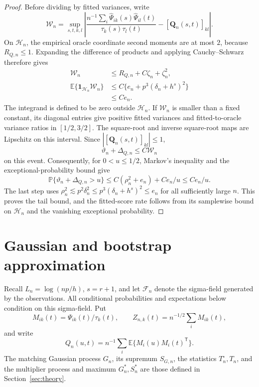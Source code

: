 \documentclass[10pt]{book}
\newcommand{\bQ}{{\mathbf Q}}
\newcommand{\expect}{\mathbb{E}}
\newcommand{\prob}{\mathbb{P}}
\newcommand{\trans}{{\scriptscriptstyle\mathsf{T}}}
\numberwithin{equation}{section}
\begin{document}
\begin{proof}
Before dividing by fitted variances, write
\[
\mathcal W_n=\sup_{s,t,k,l}
\left|\frac{n^{-1}\sum_i
\widehat\Psi_{ik}(s)\widehat\Psi_{il}(t)}
{\tau_k(s)\tau_l(t)}-[\bQ_n(s,t)]_{kl}\right|.
\]
On $\mathcal H_n$, the empirical oracle coordinate second moments
are at most $2$, because $R_{Q,n}\le1$.  Expanding the difference
of products and applying Cauchy--Schwarz therefore gives
\[
\begin{aligned}
\mathcal W_n&\le R_{Q,n}+C\zeta_n+\zeta_n^2,\\
\expect\{\mathbf1_{\mathcal H_n}\mathcal W_n\}
&\le C\{e_n+p^3(\delta_n+h^s)^2\}\\
&\le Ce_n.
\end{aligned}
\]
The integrand is defined to be zero outside $\mathcal H_n$.
If $\mathcal W_n$ is smaller than a fixed constant, its diagonal
entries give positive fitted variances and fitted-to-oracle variance
ratios in $[1/2,3/2]$.  The square-root and inverse square-root maps
are Lipschitz on this interval.  Since $|[\bQ_n(s,t)]_{kl}|\le1$,
\[
\vartheta_n+\Delta_{Q,n}\le C\mathcal W_n
\]
on this event.  Consequently, for $0<u\le1/2$, Markov's inequality
and the exceptional-probability bound give
\[
\prob\{\vartheta_n+\Delta_{Q,n}>u\}
\le C(\rho_n^2+e_n)+Ce_n/u\le Ce_n/u.
\]
The last step uses $\rho_n^2\lesssim p^2\delta_n^2
\le p^3(\delta_n+h^s)^2\le e_n$ for all sufficiently large $n$.
This proves the tail bound, and the
fitted-score rate follows from its samplewise bound on
$\mathcal H_n$ and the vanishing exceptional probability.
\end{proof}

\section{Gaussian and bootstrap approximation}
\label{app:hd-approximation}\label{app:approximation-proofs}

Recall $L_n=\log(np/h)$, $s=r+1$, and let $\mathcal F_n$ denote the
sigma-field generated by the observations. All conditional probabilities
and expectations below condition on this sigma-field. Put
\[
 M_{ik}(t)=\Psi_{ik}(t)/\tau_k(t),\qquad
 Z_{n,k}(t)=n^{-1/2}\sum_i M_{ik}(t),
\]
and write
\[
Q_n(u,t)=n^{-1}\sum_i\expect\{M_i(u)M_i(t)^\trans\}.
\]
The matching Gaussian process $G_n$, its supremum $S_{G,n}$, the
statistics $T_n^\circ,T_n$, and the multiplier process and maximum
$G_n^*,S_n^*$ are those defined in Section~\ref{sec:theory}.
\end{document}
